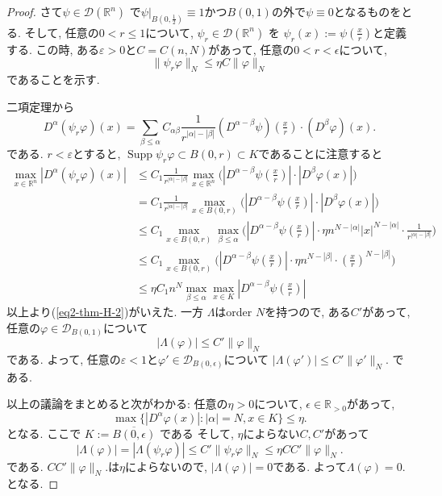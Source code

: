 \begin{proof}
さて\(\psi \in \mathcal{D}(\mathbb{R}^n)\) 
で\(\psi|_{B(0,\tfrac{1}{2})} \equiv 1\)かつ\(B(0,1)\)の外で\(\psi \equiv 0\)となるものをとる. 
そして, 任意の\(0 <  r \le 1\)について, \(\psi_r \in \mathcal{D}(\mathbb{R}^n)\) を
\(\psi_r(x) := \psi(\tfrac{x}{r})\)と定義する. 
この時, ある$\varepsilon>0$と$C=C(n,N)$があって, 任意の\(0 <  r < \epsilon\)について,  
\begin{equation}
\label{eq2-thm-H-2}
\|\psi_r \varphi\|_N \le \eta C \|\varphi\|_N 
\end{equation}
であることを示す. 

二項定理から
\[
D^\alpha(\psi_r \varphi)(x) 
= \sum_{\beta \le \alpha} C_{\alpha \beta} 
\frac{1}{r^{|\alpha|-|\beta|}} (D^{\alpha-\beta}\psi)(\tfrac{x}{r}) \cdot (D^\beta \varphi)(x).
\]
である. 
$r < \varepsilon$とすると, $\operatorname{Supp} \psi_r \varphi  \subset B(0,r) \subset K$であることに注意すると
\begin{align*}
\max_{x \in \mathbb{R}^n} |D^\alpha (\psi_r \varphi)(x)|
&\le 
C_1 \frac{1}{r^{|\alpha|-|\beta|}} \max_{x \in \mathbb{R}^n} 
\Big(|D^{\alpha-\beta}\psi(\tfrac{x}{r})| \cdot |D^\beta \varphi(x)|\Big)\\
&= 
C_1 \frac{1}{r^{|\alpha|-|\beta|}} 
\max_{x \in B(0,r)} \Big(|D^{\alpha-\beta}\psi(\tfrac{x}{r})| \cdot |D^\beta \varphi(x)|\Big)\\
&\le 
C_1 \max_{x \in B(0,r)} \max_{\beta \le \alpha} 
\Big( |D^{\alpha-\beta}\psi(\tfrac{x}{r})| 
\cdot \eta n^{N-|\alpha|} |x|^{N-|\alpha|} \cdot \frac{1}{r^{|\alpha|-|\beta|}} \Big) \\
&\le 
C_1 \max_{x \in B(0,r)}
\Big( |D^{\alpha-\beta}\psi(\tfrac{x}{r})| 
\cdot \eta n^{N-|\beta|} \cdot  (\tfrac{x}{r})^{N-|\beta|}\Big) \\
&\le 
\eta C_1 n^N \max_{\beta \le \alpha} \max_{x \in K}  |D^{\alpha-\beta}\psi(\tfrac{x}{r})| 
\end{align*}
以上より(\ref{eq2-thm-H-2})がいえた.
一方 \(\Lambda\)はorder \(N\)を持つので, ある\(C'\)があって, 
任意の$\varphi \in \mathcal{D}_{B(0,1)}$について
\[
|\Lambda(\varphi)| \le C' \|\varphi\|_N 
\]
である. よって, 任意の$\varepsilon <1$と\(\varphi' \in \mathcal{D}_{B(0,\epsilon)}\)について
\(|\Lambda(\varphi')| \le C' \|\varphi'\|_N\).  
である. 

以上の議論をまとめると次がわかる:
任意の$\eta>0$について, 
\( \epsilon \in \mathbb{R}_{>0}\)があって, 
\[
\max \{ |D^\alpha \varphi(x)| : |\alpha|=N, x \in K \} \le \eta.
\]
となる. ここで  \(K:=\overline{B(0,\epsilon)}\) である
そして, $\eta$によらない$C, C'$があって
\[
|\Lambda(\varphi)| = |\Lambda(\psi_r \varphi)| 
\le C' \|\psi_r \varphi\|_N \le \eta CC' \|\varphi\|_N.
\]
である. $CC' \|\varphi\|_N.$は$\eta$によらないので, 
\(|\Lambda(\varphi)| = 0\)である. よって\(\Lambda(\varphi) = 0.\)  となる.
\end{proof}

